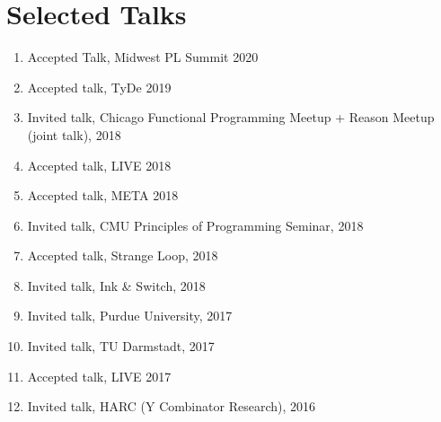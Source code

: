 \documentclass[10pt,letterpaper]{article}
\renewenvironment{itemize}{
  \begin{list}{}{
    \setlength{\leftmargin}{1.25em}
    \setlength{\itemsep}{0.25em}
    \setlength{\parskip}{0pt}
    \setlength{\parsep}{0.2em}
  }
}{
  \end{list}
}
\begin{document}
\section*{Selected Talks}
\begin{enumerate}
  \item Accepted Talk, Midwest PL Summit 2020
  \item Accepted talk, TyDe 2019
  \item Invited talk, Chicago Functional Programming Meetup + Reason Meetup (joint talk), 2018
  \item Accepted talk, LIVE 2018
  \item Accepted talk, META 2018
  \item Invited talk, CMU Principles of Programming Seminar, 2018
  \item Accepted talk, Strange Loop, 2018 
  \item Invited talk, Ink \& Switch, 2018
  \item Invited talk, Purdue University, 2017
  \item Invited talk, TU Darmstadt, 2017
  \item Accepted talk, LIVE 2017
  \item Invited talk, HARC (Y Combinator Research), 2016


\end{enumerate}
\end{document}
